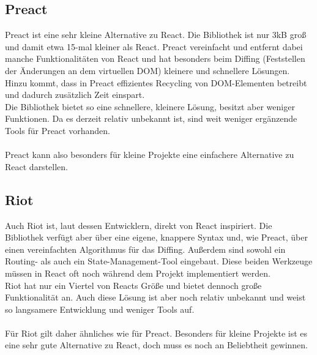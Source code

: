 \subsection{Preact}
Preact ist eine sehr kleine Alternative zu React. Die Bibliothek ist nur 3kB groß und damit etwa 15-mal kleiner als React. Preact vereinfacht und entfernt dabei manche Funktionalitäten von React und hat besonders beim Diffing (Feststellen der Änderungen an dem virtuellen DOM) kleinere und schnellere Lösungen. Hinzu kommt, dass in Preact effizientes Recycling von DOM-Elementen betreibt und dadurch zusätzlich Zeit einspart. \\
Die Bibliothek bietet so eine schnellere, kleinere Lösung, besitzt aber weniger Funktionen. Da es derzeit relativ unbekannt ist, sind weit weniger ergänzende Tools für Preact vorhanden. \\\\
Preact kann also besonders für kleine Projekte eine einfachere Alternative zu React darstellen.
\subsection{Riot}
Auch Riot ist, laut dessen Entwicklern, direkt von React inspiriert. Die Bibliothek verfügt aber über eine eigene, knappere Syntax und, wie Preact, über einen vereinfachten Algorithmus für das Diffing. Außerdem sind sowohl ein Routing- als auch ein State-Management-Tool eingebaut. Diese beiden Werkzeuge müssen in React oft noch während dem Projekt implementiert werden.\\
Riot hat nur ein Viertel von Reacts Größe und bietet dennoch große Funktionalität an. Auch diese Lösung ist aber noch relativ unbekannt und weist so langsamere Entwicklung und weniger Tools auf.\\\\
Für Riot gilt daher ähnliches wie für Preact. Besonders für kleine Projekte ist es eine sehr gute Alternative zu React, doch muss es noch an Beliebtheit gewinnen.
